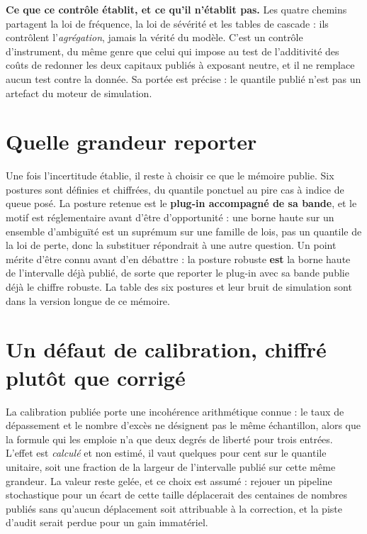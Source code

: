 \begin{cle}
\textbf{Ce que ce contrôle établit, et ce qu'il n'établit pas.} Les quatre chemins partagent la
loi de fréquence, la loi de sévérité et les tables de cascade : ils contrôlent
l'\emph{agrégation}, jamais la vérité du modèle. C'est un contrôle d'instrument, du même genre
que celui qui impose au test de l'additivité des coûts de redonner les deux capitaux publiés à
exposant neutre, et il ne remplace aucun test contre la donnée. Sa portée est précise : le
quantile publié n'est pas un artefact du moteur de simulation.
\end{cle}


\section{Quelle grandeur reporter}
\label{sec:predictive-robuste}
\label{sec:posture-retenue}
Une fois l'incertitude établie, il reste à choisir ce que le mémoire publie. Six postures
sont définies et chiffrées, du quantile ponctuel au pire cas à indice de queue posé. La
posture retenue est le \textbf{plug-in accompagné de sa bande}, et le motif est
réglementaire avant d'être d'opportunité : une borne haute sur un ensemble d'ambiguïté est
un suprémum sur une famille de lois, pas un quantile de la loi de perte, donc la
substituer répondrait à une autre question. Un point mérite d'être connu avant d'en
débattre : la posture robuste \textbf{est} la borne haute de l'intervalle déjà publié, de
sorte que reporter le plug-in avec sa bande publie déjà le chiffre robuste. La table des
six postures et leur bruit de simulation sont dans la version longue de ce mémoire.

\section{Un défaut de calibration, chiffré plutôt que corrigé}
\label{sec:pu-coherence}
La calibration publiée porte une incohérence arithmétique connue : le taux de dépassement
et le nombre d'excès ne désignent pas le même échantillon, alors que la formule qui les
emploie n'a que deux degrés de liberté pour trois entrées. L'effet est \emph{calculé} et
non estimé, il vaut quelques pour cent sur le quantile unitaire, soit une fraction de la
largeur de l'intervalle publié sur cette même grandeur. La valeur reste gelée, et ce choix
est assumé : rejouer un pipeline stochastique pour un écart de cette taille déplacerait
des centaines de nombres publiés sans qu'aucun déplacement soit attribuable à la
correction, et la piste d'audit serait perdue pour un gain immatériel.

